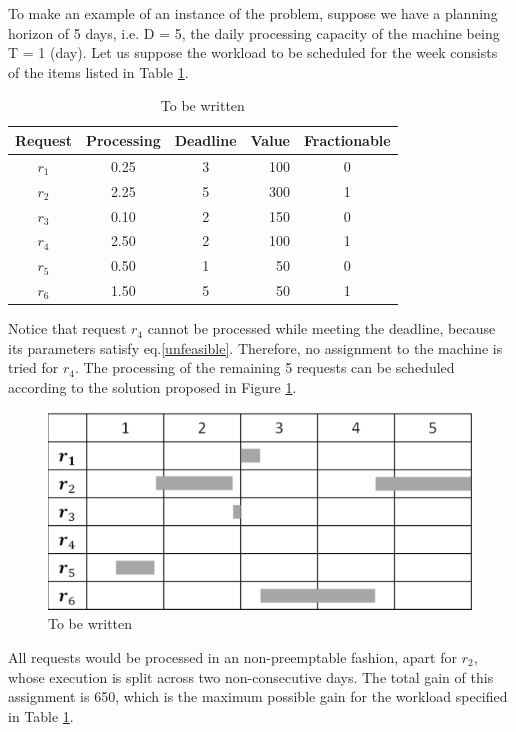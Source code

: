 \documentclass{IEEEtran}
\begin{document}
To make an example of an instance of the problem, suppose we have a planning horizon of 5 days, i.e. D = 5, the daily processing capacity of the machine being T = 1 (day). Let us suppose the workload to be scheduled for the week consists of the items listed  in   Table \ref{example}. 
\begin{table}[h!]
\centering
\begin{tabular}{|cccrc|}
\hline
{\bf Request} & {\bf Processing} & {\bf Deadline} & {\bf Value} & {\bf Fractionable} \\ \hline
$r_1$ & 0.25 & 3 & 100 & 0 \\ \hline
$r_2$ & 2.25 & 5 & 300 & 1 \\ \hline
$r_3$ & 0.10 & 2 & 150 & 0 \\ \hline
$r_4$ & 2.50 & 2 & 100 & 1 \\ \hline
$r_5$ & 0.50 & 1 & 50 & 0 \\ \hline
$r_6$ & 1.50 & 5 & 50 & 1 \\ \hline
\end{tabular}
\caption{To be written}
\label{example}
\end{table}
Notice that request $r_4$ cannot be processed while meeting the deadline, because  its parameters satisfy eq.\ref{unfeasible}. 
Therefore, no assignment to the machine is tried for $r_4$. The processing of the remaining 5 requests can be scheduled according to the solution proposed in Figure \ref{solution}. 
\begin{figure}[h!]
\centering
\includegraphics[scale=0.25]{Schedule.pdf}
\caption{To be written}
\label{solution}
\end{figure}
All requests would be processed in an non-preemptable fashion, apart for $r_2$, whose execution is split across two non-consecutive days.  The total gain of this assignment is 650, which is the maximum possible gain for the workload specified in Table \ref{example}.  
 
\end{document}
